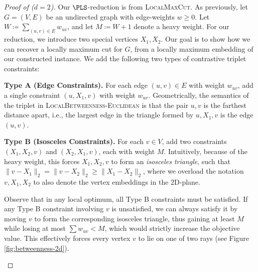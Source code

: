 \documentclass{article}
\theoremstyle{definition}  %
\theoremstyle{plain}
\numberwithin{observation}{section}
\numberwithin{claim}{section}
\numberwithin{fact}{section}
\numberwithin{lemma}{section}
\numberwithin{proposition}{section}
\numberwithin{theorem}{section}
\numberwithin{corollary}{section}
\numberwithin{definition}{section}
\theoremstyle{plain}
\begin{document}
\begin{proof}[Proof of  ($d=2$)]
 Our $\PLS$-reduction is from \textsc{LocalMaxCut}. As previously, let $G = (V, E)$ be an undirected graph with edge-weights $w\ge0$. Let $W\coloneq \sum_{(u,v) \in E} w_{uv}$, and let $M \coloneq W + 1$ denote a heavy weight. 
 For our reduction, we introduce two special vertices $X_1, X_2$. %
 Our goal is to show how we can recover a locally maximum cut for $G$, from a locally maximum embedding of our constructed instance. We add the following two types of contrastive triplet constraints:
    \item \textbf{Type A (Edge Constraints).}
For each edge $(u, v) \in E$ with weight $w_{uv}$, add a single constraint $(u, X_1, v)$ with weight $w_{uv}$. Geometrically, the semantics of the triplet in \textsc{LocalBetweenness-Euclidean} is that the pair $u,v$ is the farthest distance apart, i.e., the largest edge in the triangle formed by $u, X_1, v$ is the edge $(u,v)$.

\item \textbf{Type B (Isosceles Constraints).}
For each $v \in V$, add two constraints $(X_1, X_2, v)$ and $(X_2, X_1, v)$, each with weight $M$.
Intuitively, because of the heavy weight, this forces $X_1, X_2, v$ to form an \emph{isosceles triangle}, such that $\| v - X_1 \|_2 = \| v - X_2 \|_2 \geq \| X_1 - X_2 \|_2$, where we overload the notation $v,X_1,X_2$ to also denote the vertex embeddings in the 2D-plane.

Observe that in any local optimum, all Type B constraints must be satisfied. If any Type B constraint involving $v$ is unsatisfied, we can always satisfy it by moving $v$ to form the corresponding isosceles triangle, thus gaining at least $M$ while losing at most $\sum w_{uv} < M$, which would strictly increase the objective value. This effectively forces every vertex $v$ to lie on one of two rays (see Figure \ref{fig:betweenness-2d}).

\begin{figure}[ht]
    \centering
    \begin{minipage}{0.45\textwidth}
        \centering
\end{minipage}
\end{figure}
\end{proof}
\end{document}
